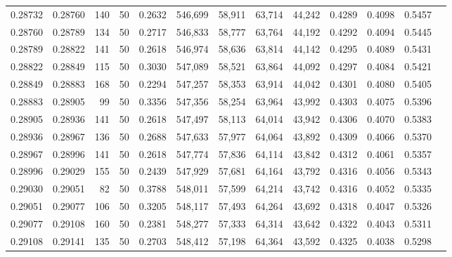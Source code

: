 \begin{tabular}{rrrrrrrrrrrrr}
0.28732 & 0.28760 &   140 &  50 &                                     0.2632 & 546,699 &  58,911 &  63,714 &  44,242 & 0.4289 & 0.4098 & 0.5457 \\
0.28760 & 0.28789 &   134 &  50 &                                     0.2717 & 546,833 &  58,777 &  63,764 &  44,192 & 0.4292 & 0.4094 & 0.5445 \\
0.28789 & 0.28822 &   141 &  50 &                                     0.2618 & 546,974 &  58,636 &  63,814 &  44,142 & 0.4295 & 0.4089 & 0.5431 \\
0.28822 & 0.28849 &   115 &  50 &                                     0.3030 & 547,089 &  58,521 &  63,864 &  44,092 & 0.4297 & 0.4084 & 0.5421 \\
0.28849 & 0.28883 &   168 &  50 &                                     0.2294 & 547,257 &  58,353 &  63,914 &  44,042 & 0.4301 & 0.4080 & 0.5405 \\
0.28883 & 0.28905 &    99 &  50 &                                     0.3356 & 547,356 &  58,254 &  63,964 &  43,992 & 0.4303 & 0.4075 & 0.5396 \\
0.28905 & 0.28936 &   141 &  50 &                                     0.2618 & 547,497 &  58,113 &  64,014 &  43,942 & 0.4306 & 0.4070 & 0.5383 \\
0.28936 & 0.28967 &   136 &  50 &                                     0.2688 & 547,633 &  57,977 &  64,064 &  43,892 & 0.4309 & 0.4066 & 0.5370 \\
0.28967 & 0.28996 &   141 &  50 &                                     0.2618 & 547,774 &  57,836 &  64,114 &  43,842 & 0.4312 & 0.4061 & 0.5357 \\
0.28996 & 0.29029 &   155 &  50 &                                     0.2439 & 547,929 &  57,681 &  64,164 &  43,792 & 0.4316 & 0.4056 & 0.5343 \\
0.29030 & 0.29051 &    82 &  50 &                                     0.3788 & 548,011 &  57,599 &  64,214 &  43,742 & 0.4316 & 0.4052 & 0.5335 \\
0.29051 & 0.29077 &   106 &  50 &                                     0.3205 & 548,117 &  57,493 &  64,264 &  43,692 & 0.4318 & 0.4047 & 0.5326 \\
0.29077 & 0.29108 &   160 &  50 &                                     0.2381 & 548,277 &  57,333 &  64,314 &  43,642 & 0.4322 & 0.4043 & 0.5311 \\
0.29108 & 0.29141 &   135 &  50 &                                     0.2703 & 548,412 &  57,198 &  64,364 &  43,592 & 0.4325 & 0.4038 & 0.5298 \\

\end{tabular}
